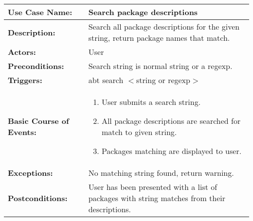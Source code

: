 
\begin{tabularx}{\linewidth}{|l|X|}
\hline
\textbf{Use Case Name:} & \textbf{Search package descriptions} \\
\hline
\textbf{Description:} & 
Search all package descriptions for the given string, return package names that match. \\
\hline
\textbf{Actors:} & User \\
\hline
\textbf{Preconditions:} & Search string is normal string or a regexp. \\
\hline
\textbf{Triggers:} & abt search $<$string or regexp$>$ \\
\hline
\textbf{Basic Course of Events:} & 
\begin{minipage}{\linewidth} 
  \vspace{0.05em}
  \begin{enumerate}
    \item User submits a search string.
    \item All package descriptions are searched for match to given string.
    \item Packages matching are displayed to user.
  \end{enumerate}
  \vspace{0.05em}
\end{minipage}
\\
\hline 
\textbf{Exceptions:} & No matching string found, return warning. \\
\hline 
\textbf{Postconditions:} &
User has been presented with a list of packages with string matches from their descriptions. \\
\hline
\end{tabularx}

